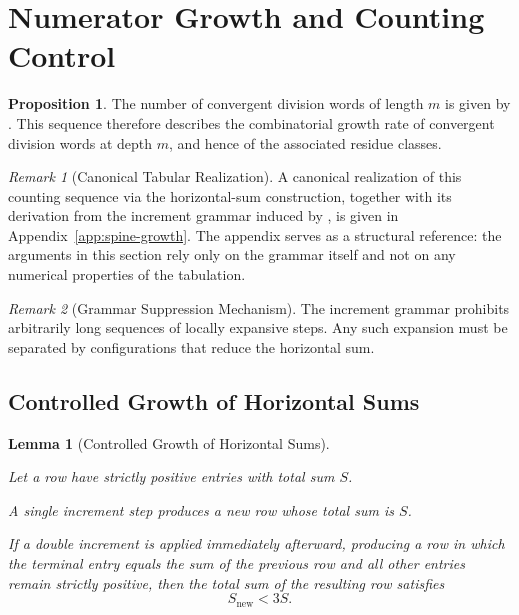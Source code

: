 \documentclass[12pt, oneside]{article}
\numberwithin{equation}{section}
\theoremstyle{definition}
\newtheorem{proposition}{Proposition}[section]
\theoremstyle{plain}
\newtheorem{lemma}[theorem]{Lemma}
\theoremstyle{remark}
\newtheorem*{remark}{Remark}
\begin{document}
\section{Numerator Growth and Counting Control}
\label{sec:numerator-growth}

\begin{proposition}
The number of convergent division words of length $m$ is given by .
This sequence therefore describes the combinatorial growth rate of convergent
division words at depth $m$, and hence of the associated residue classes.
\end{proposition}

\begin{remark}[Canonical Tabular Realization]
A canonical realization of this counting sequence via the horizontal-sum construction,
together with its derivation from the increment grammar induced by , is given
in Appendix~\ref{app:spine-growth}. The appendix serves as a structural reference:
the arguments in this section rely only on the grammar itself and not on any numerical
properties of the tabulation.
\end{remark}

\begin{remark}[Grammar Suppression Mechanism]
\label{rem:grammar-suppression}
The increment grammar prohibits arbitrarily long sequences of locally expansive steps.
Any such expansion must be separated by configurations that reduce the horizontal sum.
\end{remark}

\subsection{Controlled Growth of Horizontal Sums}

\begin{lemma}[Controlled Growth of Horizontal Sums]
\label{lem:controlled-horizontal-growth}

Let a row have strictly positive entries with total sum $S$.

A single increment step produces a new row whose total sum is $S$.

If a double increment is applied immediately afterward, producing a row in which
the terminal entry equals the sum of the previous row and all other entries remain
strictly positive, then the total sum of the resulting row satisfies
\[
S_{\mathrm{new}} < 3S.
\]
\end{lemma}
\end{document}
